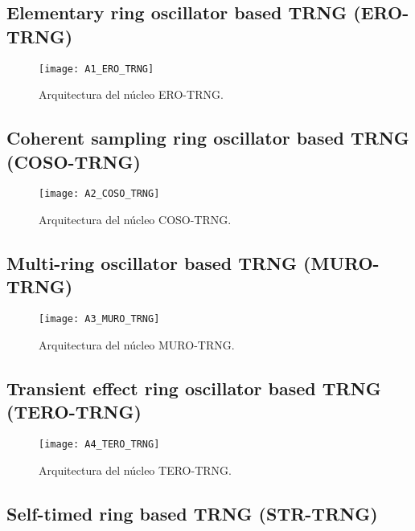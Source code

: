 		\subsection{Elementary ring oscillator based TRNG (ERO-TRNG)}
		
					
				\begin{figure}[hbtp]
					\caption{Arquitectura del núcleo ERO-TRNG.}
					\centering
					\texttt{[image: A1\_ERO\_TRNG]}
					\label{fig:A1_ERO_TRNG}
				\end{figure}
			
			
			
		\subsection{Coherent sampling ring oscillator based TRNG (COSO-TRNG)}
	
				
				\begin{figure}[hbtp]
					\caption{Arquitectura del núcleo COSO-TRNG.}
					\centering
					\texttt{[image: A2\_COSO\_TRNG]}
					\label{fig:A2_COSO_TRNG}
				\end{figure}
				
				
				
		\subsection{Multi-ring oscillator based TRNG (MURO-TRNG)}
	
				
				\begin{figure}[hbtp]
					\caption{Arquitectura del núcleo MURO-TRNG.}
					\centering
					\texttt{[image: A3\_MURO\_TRNG]}
					\label{fig:A3_MURO_TRNG}
				\end{figure}
				
				
				
		\subsection{Transient effect ring oscillator based TRNG (TERO-TRNG)}
	
				
				\begin{figure}[hbtp]
					\caption{Arquitectura del núcleo TERO-TRNG.}
					\centering
					\texttt{[image: A4\_TERO\_TRNG]}
					\label{fig:A4_TERO_TRNG}
				\end{figure}
				
				
				
		\subsection{Self-timed ring based TRNG (STR-TRNG)}
	

